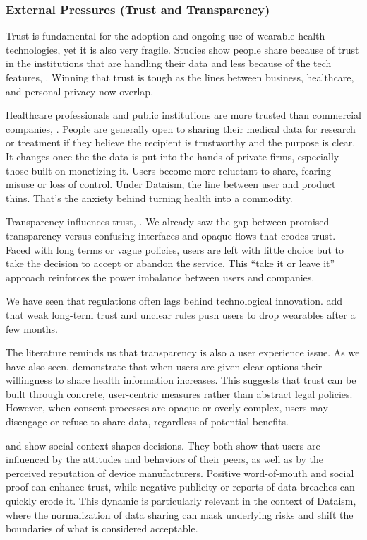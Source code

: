	\subsubsection{External Pressures (Trust and Transparency)}

	Trust is fundamental for the adoption and ongoing use of wearable health technologies, yet it is also very fragile. Studies show people share because of trust in the institutions that are handling their data and less because of the tech features, \cite{Hutchings2020}. Winning that trust is tough as the lines between business, healthcare, and personal privacy now overlap.

	Healthcare professionals and public institutions are more trusted than commercial companies, \cite{Hutchings2020}. People are generally open to sharing their medical data for research or treatment if they believe the recipient is trustworthy and the purpose is clear. It changes once the the data is put into the hands of private firms, especially those built on monetizing it. Users become more reluctant to share, fearing misuse or loss of control. Under Dataism, the line between user and product thins. That's the anxiety behind turning health into a commodity.

	Transparency influences trust, \cite{Sui2023}. We already saw the gap between promised transparency versus confusing interfaces and opaque flows that erodes trust. Faced with long terms or vague policies, users are left with little choice but to take the decision to accept or abandon the service. This “take it or leave it” approach reinforces the power imbalance between users and companies.

	We have seen that regulations often lags behind technological innovation. \cite{Niknejad2020} add that weak long-term trust and unclear rules push users to drop wearables after a few months.

	The literature reminds us that transparency is also a user experience issue. As we have also seen, \cite{Gupta2023} demonstrate that when users are given clear options their willingness to share health information increases. This suggests that trust can be built through concrete, user-centric measures rather than abstract legal policies. However, when consent processes are opaque or overly complex, users may disengage or refuse to share data, regardless of potential benefits.

	\cite{Pentina2016} and \cite{Li2019} show social context shapes decisions. They both show that users are influenced by the attitudes and behaviors of their peers, as well as by the perceived reputation of device manufacturers. Positive word-of-mouth and social proof can enhance trust, while negative publicity or reports of data breaches can quickly erode it. This dynamic is particularly relevant in the context of Dataism, where the normalization of data sharing can mask underlying risks and shift the boundaries of what is considered acceptable.

